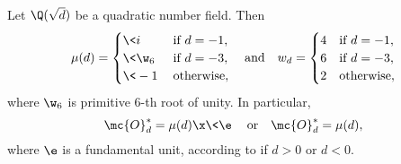     \begin{proposition}
      Let $\Q(\sqrt{d})$ be a quadratic number field. Then
      \[
        \mu(d) = \begin{cases} \<i\> & \text{if $d = -1$}, \\ \<\w_{6}\> & \text{if $d = -3$}, \\ \<-1\> & \text{otherwise}, \end{cases} \quad \text{and} \quad w_{d} = \begin{cases} 4 & \text{if $d = -1$}, \\ 6 & \text{if $d = -3$}, \\ 2 & \text{otherwise}, \end{cases}
      \]
      where $\w_{6}$ is primitive $6$-th root of unity. In particular,
      \[
        \mc{O}_{d}^{\ast} = \mu(d) \x \<\e\> \quad \text{or} \quad \mc{O}_{d}^{\ast} = \mu(d),
      \]
      where $\e$ is a fundamental unit, according to if $d > 0$ or $d < 0$.
    \end{proposition}
